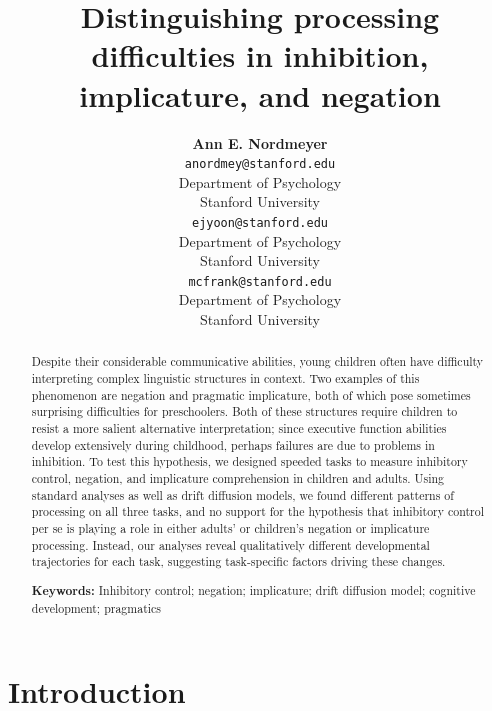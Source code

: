 \documentclass[10pt,letterpaper]{article}
\title{Distinguishing processing difficulties in inhibition, implicature, and negation}
\author{{\large \bf Ann E. Nordmeyer} \\
 \texttt{anordmey@stanford.edu} \\
 Department of Psychology \\
 Stanford University
 \And {\large \bf Erica J. Yoon} \\
 \texttt{ejyoon@stanford.edu} \\
 Department of Psychology \\
 Stanford University
 \And {\large \bf Michael C. Frank} \\
 \texttt{mcfrank@stanford.edu} \\
 Department of Psychology \\
 Stanford University}
\newcommand{\ejy}[1]{\textcolor{Blue}{[ejy: #1]}}
\newcommand{\aen}[1]{\textcolor{DarkOrange}{[aen: #1]}}
\begin{document}
\maketitle


\begin{abstract}

Despite their considerable communicative abilities, young children often have difficulty interpreting complex linguistic structures in context. Two examples of this phenomenon are negation and pragmatic implicature, both of which pose sometimes surprising difficulties for preschoolers. Both of these structures require children to resist a more salient alternative interpretation; since executive function abilities develop extensively during childhood, perhaps failures are due to problems in inhibition. To test this hypothesis, we designed speeded tasks to measure inhibitory control, negation, and implicature comprehension in children and adults. Using standard analyses as well as drift diffusion models, we found different patterns of processing on all three tasks, and no support for the hypothesis that inhibitory control per se is playing a role in either adults' or children's negation or implicature processing. Instead, our analyses reveal qualitatively different developmental trajectories for each task, suggesting task-specific factors driving these changes.

\textbf{Keywords:}
Inhibitory control; negation; implicature; drift diffusion model; cognitive development; pragmatics
\end{abstract}


\section{Introduction}

%
%
\end{document}

